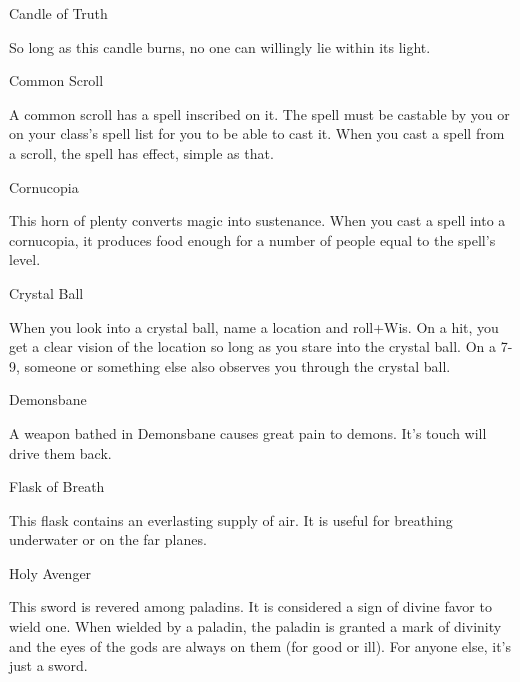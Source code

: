        

Candle of Truth	 

       

So long as this candle burns, no one can willingly lie within its light.

       

Common Scroll	 

       

A common scroll has a spell inscribed on it. The spell must be castable by you or on your class's spell list for you to be able to cast it. When you cast a spell from a scroll, the spell has effect, simple as that.

       

Cornucopia	 

       

This horn of plenty converts magic into sustenance. When you cast a spell into a cornucopia, it produces food enough for a number of people equal to the spell's level.

       

Crystal Ball	 

       

When you look into a crystal ball, name a location and roll+Wis. On a hit, you get a clear vision of the location so long as you stare into the crystal ball. On a 7-9, someone or something else also observes you through the crystal ball.

       

Demonsbane	 

       

A weapon bathed in Demonsbane causes great pain to demons. It's touch will drive them back.

       

Flask of Breath	 

       

This flask contains an everlasting supply of air. It is useful for breathing underwater or on the far planes.

       

Holy Avenger	 

       

This sword is revered among paladins. It is considered a sign of divine favor to wield one. When wielded by a paladin, the paladin is granted a mark of divinity and the eyes of the gods are always on them (for good or ill). For anyone else, it’s just a sword.


